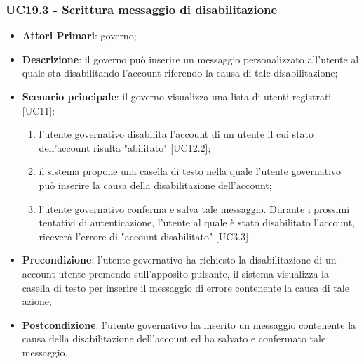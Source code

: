 \subsubsection{UC19.3 - Scrittura messaggio di disabilitazione}
\begin{itemize}
	\item \textbf{Attori Primari}:
	governo;
	\item \textbf{Descrizione}: il governo può inserire un messaggio personalizzato all'utente al quale sta disabilitando l'account riferendo la causa di tale disabilitazione;
	\item \textbf{Scenario principale}: il governo visualizza una lista di utenti registrati [UC11]:
	\begin{enumerate}[label=\alph*.]
		\item l'utente governativo disabilita l'account di un utente il cui stato dell'account risulta "abilitato" [UC12.2];
		\item il sistema propone una casella di testo nella quale l'utente governativo può inserire la causa della disabilitazione dell'account;
		\item l'utente governativo conferma e salva tale messaggio. Durante i prossimi tentativi di autenticazione, l'utente al quale è stato disabilitato l'account, riceverà l'errore di "account disabilitato" [UC3.3].
	\end{enumerate}
	 
	\item \textbf{Precondizione}: l'utente governativo ha richiesto la disabilitazione di un account utente premendo sull'apposito pulsante, il sistema visualizza la casella di testo per inserire il messaggio di errore contenente la causa di tale azione;
	\item \textbf{Postcondizione}: l'utente governativo ha inserito un messaggio contenente la causa della disabilitazione dell'account ed ha salvato e confermato tale messaggio.
\end{itemize}


